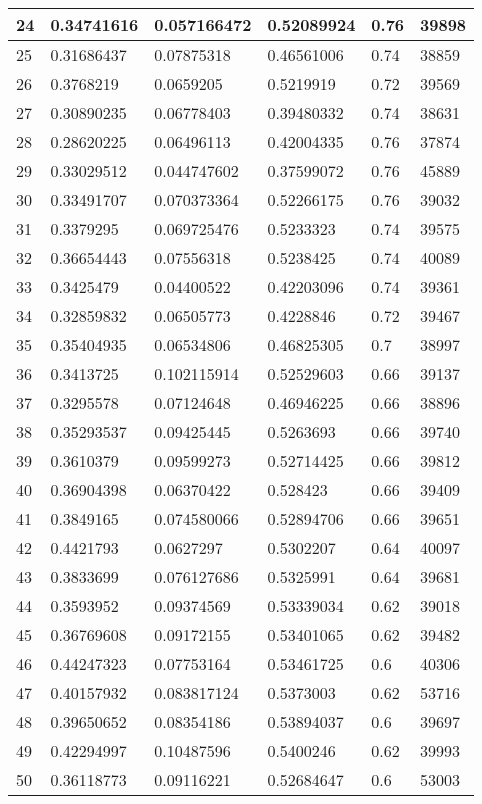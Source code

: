 \begin{longtable}{|l|l|l|l|l|l|}
24 & 0.34741616 & 0.057166472 & 0.52089924 & 0.76 & 39898 \\ \hline 
25 & 0.31686437 & 0.07875318 & 0.46561006 & 0.74 & 38859 \\ \hline 
26 & 0.3768219 & 0.0659205 & 0.5219919 & 0.72 & 39569 \\ \hline 
27 & 0.30890235 & 0.06778403 & 0.39480332 & 0.74 & 38631 \\ \hline 
28 & 0.28620225 & 0.06496113 & 0.42004335 & 0.76 & 37874 \\ \hline 
29 & 0.33029512 & 0.044747602 & 0.37599072 & 0.76 & 45889 \\ \hline 
30 & 0.33491707 & 0.070373364 & 0.52266175 & 0.76 & 39032 \\ \hline 
31 & 0.3379295 & 0.069725476 & 0.5233323 & 0.74 & 39575 \\ \hline 
32 & 0.36654443 & 0.07556318 & 0.5238425 & 0.74 & 40089 \\ \hline 
33 & 0.3425479 & 0.04400522 & 0.42203096 & 0.74 & 39361 \\ \hline 
34 & 0.32859832 & 0.06505773 & 0.4228846 & 0.72 & 39467 \\ \hline 
35 & 0.35404935 & 0.06534806 & 0.46825305 & 0.7 & 38997 \\ \hline 
36 & 0.3413725 & 0.102115914 & 0.52529603 & 0.66 & 39137 \\ \hline 
37 & 0.3295578 & 0.07124648 & 0.46946225 & 0.66 & 38896 \\ \hline 
38 & 0.35293537 & 0.09425445 & 0.5263693 & 0.66 & 39740 \\ \hline 
39 & 0.3610379 & 0.09599273 & 0.52714425 & 0.66 & 39812 \\ \hline 
40 & 0.36904398 & 0.06370422 & 0.528423 & 0.66 & 39409 \\ \hline 
41 & 0.3849165 & 0.074580066 & 0.52894706 & 0.66 & 39651 \\ \hline 
42 & 0.4421793 & 0.0627297 & 0.5302207 & 0.64 & 40097 \\ \hline 
43 & 0.3833699 & 0.076127686 & 0.5325991 & 0.64 & 39681 \\ \hline 
44 & 0.3593952 & 0.09374569 & 0.53339034 & 0.62 & 39018 \\ \hline 
45 & 0.36769608 & 0.09172155 & 0.53401065 & 0.62 & 39482 \\ \hline 
46 & 0.44247323 & 0.07753164 & 0.53461725 & 0.6 & 40306 \\ \hline 
47 & 0.40157932 & 0.083817124 & 0.5373003 & 0.62 & 53716 \\ \hline 
48 & 0.39650652 & 0.08354186 & 0.53894037 & 0.6 & 39697 \\ \hline 
49 & 0.42294997 & 0.10487596 & 0.5400246 & 0.62 & 39993 \\ \hline 
50 & 0.36118773 & 0.09116221 & 0.52684647 & 0.6 & 53003 \\ \hline 
\end{longtable}